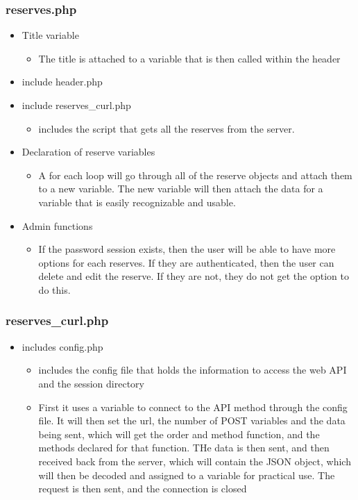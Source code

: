     \subsubsection{reserves.php}
        \begin{itemize}
            \item Title variable
            \begin{itemize}
                \item The title is attached to a variable that is then called within the header
            \end{itemize}
            \item include header.php
            \item include reserves\_curl.php
            \begin{itemize}
                \item includes the script that gets all the reserves from the server.
            \end{itemize}
            \item Declaration of reserve variables
            \begin{itemize}
                \item A for each loop will go through all of the reserve objects and attach them to a new variable. The new variable will then attach the data for a variable that is easily recognizable and usable.
            \end{itemize}
            \item Admin functions
            \begin{itemize}
                \item If the password session exists, then the user will be able to have more options for each reserves. If they are authenticated, then the user can delete and edit the reserve. If they are not, they do not get the option to do this.
            \end{itemize}
        \end{itemize}
    

    \subsubsection{reserves\_curl.php}
        \begin{itemize}
            \item includes config.php 
            \begin{itemize}
                \item includes the config file that holds the information to access the web API and the session directory
                \item First it uses a variable to connect to the API method through the config file. It will then set the url, the number of POST variables and the data being sent, which will get the order and method function, and the methods declared for that function. THe data is then sent, and then received back from the server, which will contain the JSON object, which will then be decoded and assigned to a variable for practical use. The request is then sent, and the connection is closed
            \end{itemize}
        \end{itemize}


